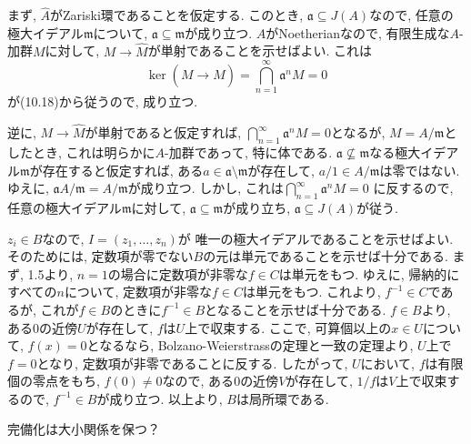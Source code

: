\documentclass[dvipdfmx]{jsarticle}
\begin{document}
    \begin{problem}
        まず, $\widehat{A}$がZariski環であることを仮定する.
        このとき, $\mathfrak{a} \subseteq J(A)$なので,
        任意の極大イデアル$\mathfrak{m}$について, $\mathfrak{a} \subseteq \mathfrak{m}$が成り立つ.
        $A$がNoetherianなので, 有限生成な$A$-加群$M$に対して, $M \to \widehat{M}$が単射であることを示せばよい.
        これは
        \[
            \ker(M \to \widehat{M}) = \bigcap_{n = 1}^\infty \mathfrak{a}^nM = 0
        \]
        が(10.18)から従うので, 成り立つ.

        逆に, $M \to \widehat{M}$が単射であると仮定すれば,
        $\bigcap_{n = 1}^\infty \mathfrak{a}^nM = 0$となるが,
        $M = A/\mathfrak{m}$としたとき, これは明らかに$A$-加群であって, 特に体である.
        $\mathfrak{a} \not \subseteq \mathfrak{m}$なる極大イデアル$\mathfrak{m}$が存在すると仮定すれば,
        ある$a \in \mathfrak{a} \setminus \mathfrak{m}$が存在して,
        $a/1 \in A/\mathfrak{m}$は零ではない.
        ゆえに, $\mathfrak{a}A/\mathfrak{m} = A/\mathfrak{m}$が成り立つ.
        しかし, これは$\bigcap_{n = 1}^\infty \mathfrak{a}^nM = 0$
        に反するので, 任意の極大イデアル$\mathfrak{m}$に対して, $\mathfrak{a} \subseteq \mathfrak{m}$が成り立ち,
        $\mathfrak{a} \subseteq J(A)$が従う.
    \end{problem}

    \begin{problem}
        $z_i \in B$なので, $I = (z_1, \dots, z_n)$が
        唯一の極大イデアルであることを示せばよい.
        そのためには, 定数項が零でない$B$の元は単元であることを示せば十分である.
        まず, 1.5より, $n = 1$の場合に定数項が非零な$f \in C$は単元をもつ.
        ゆえに, 帰納的にすべての$n$について, 定数項が非零な$f \in C$は単元をもつ.
        これより, $f^{-1} \in C$であるが, これが$f \in B$のときに$f^{-1} \in B$となることを示せば十分である.
        $f \in B$より, ある$0$の近傍$U$が存在して, $f$は$U$上で収束する.
        ここで, 可算個以上の$x \in U$について, $f(x) = 0$となるなら,
        Bolzano-Weierstrassの定理と一致の定理より, $U$上で$f = 0$となり, 定数項が非零であることに反する.
        したがって, $U$において, $f$は有限個の零点をもち,
        $f(0) \neq 0$なので, ある$0$の近傍$V$が存在して, $1/f$は$V$上で収束するので,
        $f^{-1} \in B$が成り立つ.
        以上より, $B$は局所環である.

        \color{red}
            完備化は大小関係を保つ？
        \color{black}
    \end{problem}
\end{document}
